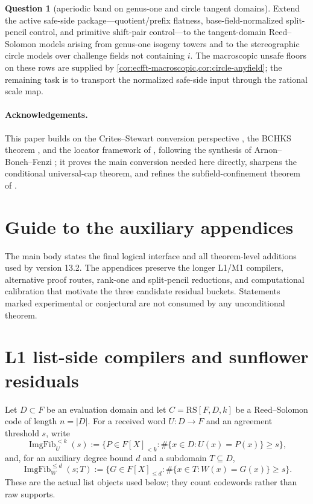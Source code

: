 \documentclass[11pt]{article}
\theoremstyle{definition}
\newtheorem{researchquestion}[researchquestion]{Question}
\theoremstyle{remark}
\newcommand{\RS}{\mathrm{RS}}
\providecommand{\ImgFib}{\operatorname{ImgFib}}
\begin{document}
\begin{researchquestion}[aperiodic band on genus-one and circle tangent domains]\label{prob:isogeny}
Extend the active safe-side package---quotient/prefix flatness, base-field-normalized split-pencil control, and primitive shift-pair control---to the tangent-domain Reed--Solomon models arising from genus-one isogeny towers and to the stereographic circle models over challenge fields not containing $i$.  The macroscopic unsafe floors on these rows are supplied by \cref{cor:ecfft-macroscopic,cor:circle-anyfield}; the remaining task is to transport the normalized safe-side input through the rational scale map.
\end{researchquestion}

\paragraph{Acknowledgements.} This paper builds on the Crites--Stewart conversion perspective \cite{CS25}, the BCHKS theorem \cite{BCHKS25}, and the locator framework of \cite{Cho26a,Cho26b}, following the synthesis of Arnon--Boneh--Fenzi \cite{ABF26}; it proves the main conversion needed here directly, sharpens the conditional universal-cap theorem, and refines the subfield-confinement theorem of \cite{Cho26b}.


\clearpage
\appendix
\section*{Guide to the auxiliary appendices}
The main body states the final logical interface and all theorem-level additions used by version 13.2.  The appendices preserve the longer L1/M1 compilers, alternative proof routes, rank-one and split-pencil reductions, and computational calibration that motivate the three candidate residual buckets.  Statements marked experimental or conjectural are not consumed by any unconditional theorem.

\section{L1 list-side compilers and sunflower residuals}\label{sec:capf-l1}

Let $D\subset F$ be an evaluation domain and let $C=\RS[F,D,k]$ be a Reed--Solomon code of length $n=|D|$.  For a received word $U:D\to F$ and an agreement threshold $s$, write
\[
        \ImgFib_U^{<k}(s):=
        \{P\in F[X]_{<k}: \#\{x\in D:U(x)=P(x)\}\ge s\},
\]
and, for an auxiliary degree bound $d$ and a subdomain $T\subseteq D$,
\[
        \ImgFib_W^{\le d}(s;T):=
        \{G\in F[X]_{\le d}: \#\{x\in T:W(x)=G(x)\}\ge s\}.
\]
These are the actual list objects used below; they count codewords rather than raw supports.
\end{document}
